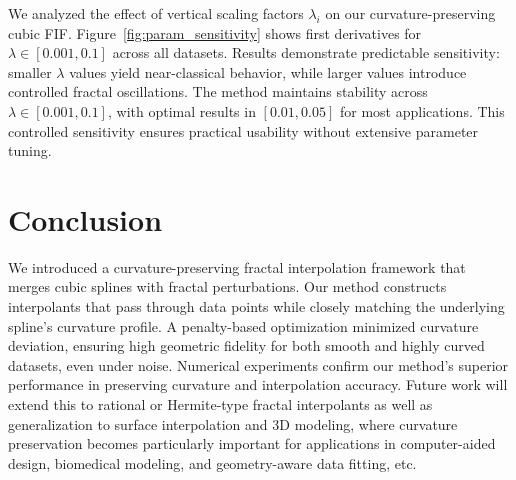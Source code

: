 \documentclass[runningheads]{llncs}
\begin{document}
	We analyzed the effect of vertical scaling factors $\lambda_i$ on our curvature-preserving cubic FIF. Figure~\ref{fig:param_sensitivity} shows first derivatives for $\lambda \in [0.001, 0.1]$ across all datasets. Results demonstrate predictable sensitivity: smaller $\lambda$ values yield near-classical behavior, while larger values introduce controlled fractal oscillations. The method maintains stability across $\lambda \in [0.001, 0.1]$, with optimal results in $[0.01, 0.05]$ for most applications. This controlled sensitivity ensures practical usability without extensive parameter tuning.
	
	\section{Conclusion}
	We introduced a curvature-preserving fractal interpolation framework that merges cubic splines with fractal perturbations. Our method constructs interpolants that pass through data points while closely matching the underlying spline's curvature profile. A penalty-based optimization minimized curvature deviation, ensuring high geometric fidelity for both smooth and highly curved datasets, even under noise. Numerical experiments confirm our method's superior performance in preserving curvature and interpolation accuracy. Future work will extend this to rational or Hermite-type fractal interpolants as well as generalization to surface interpolation and 3D modeling, where curvature preservation becomes particularly important for applications in computer-aided design, biomedical modeling, and geometry-aware data fitting, etc.
	
\end{document}
